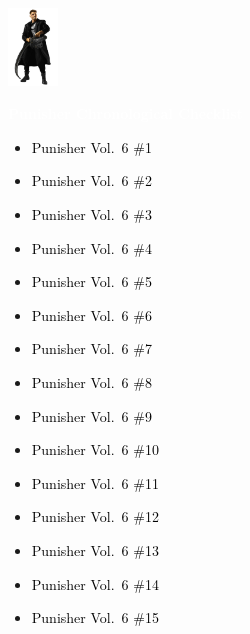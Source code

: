\documentclass[12pt]{article}
\newcommand{\checkbox}{\raisebox{0.0ex}{\fbox{\rule{0ex}{1.5ex} \rule{1.5ex}{0ex}}}}
\begin{document}
\begin{center}
    \vspace*{2cm}
    \includegraphics[width=0.1\textwidth]{PUNISHER1.PNG}
    \vspace{0.3cm}

    {\Huge \textbf{\textcolor{white}{Punisher Chronological Checklist}}}
\end{center}

\vspace{0.3cm}
\noindent
\begin{tcolorbox}[
  colback=white!95!gray,
  colframe=black,
  width=\textwidth,
  arc=4mm,
  auto outer arc,
  boxrule=0.8pt,
  left=8pt,right=8pt,top=8pt,bottom=8pt
]
\begin{itemize}[left=0pt,label={\checkbox}]
    \item \textcolor{black}{Punisher Vol.\ 6 \#1}
    \item \textcolor{black}{Punisher Vol.\ 6 \#2}
    \item \textcolor{black}{Punisher Vol.\ 6 \#3}
    \item \textcolor{black}{Punisher Vol.\ 6 \#4}
    \item \textcolor{black}{Punisher Vol.\ 6 \#5}
    \item \textcolor{black}{Punisher Vol.\ 6 \#6}
    \item \textcolor{black}{Punisher Vol.\ 6 \#7}
    \item \textcolor{black}{Punisher Vol.\ 6 \#8}
    \item \textcolor{black}{Punisher Vol.\ 6 \#9}
    \item \textcolor{black}{Punisher Vol.\ 6 \#10}
    \item \textcolor{black}{Punisher Vol.\ 6 \#11}
    \item \textcolor{black}{Punisher Vol.\ 6 \#12}
    \item \textcolor{black}{Punisher Vol.\ 6 \#13}
    \item \textcolor{black}{Punisher Vol.\ 6 \#14}
    \item \textcolor{black}{Punisher Vol.\ 6 \#15}
\end{itemize}
\end{tcolorbox}
\end{document}
